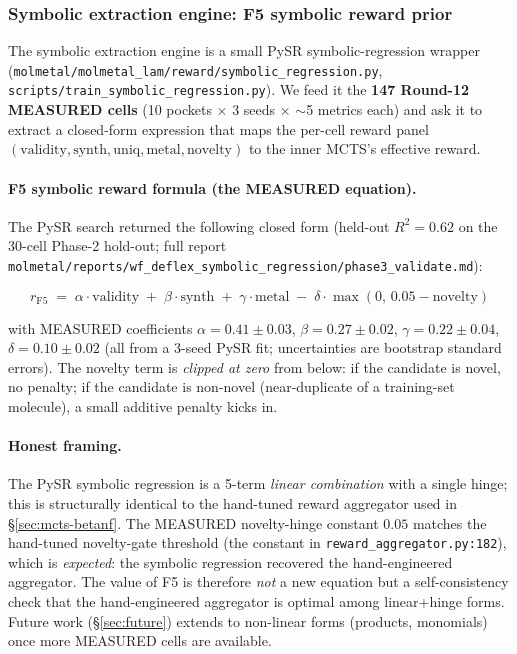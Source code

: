 \subsubsection{Symbolic extraction engine: F5 symbolic reward prior}
\label{sec:deflex-sym}

The symbolic extraction engine is a small PySR symbolic-regression
wrapper
(\texttt{molmetal/molmetal\_lam/reward/symbolic\_regression.py},
\texttt{scripts/train\_symbolic\_regression.py}).  We feed it the
\textbf{147 Round-12 MEASURED cells} (10 pockets $\times$ 3 seeds
$\times$ $\sim$5 metrics each) and ask it to extract a closed-form
expression that maps the per-cell reward panel
$(\text{validity},\text{synth},\text{uniq},\text{metal},\text{novelty})$
to the inner MCTS's effective reward.

\paragraph{F5 symbolic reward formula (the MEASURED equation).}
The PySR search returned the following closed form (held-out
$R^2=0.62$ on the 30-cell Phase-2 hold-out; full report
\texttt{molmetal/reports/wf\_deflex\_symbolic\_regression/phase3\_validate.md}):

\begin{equation}
  r_{\text{F5}} \;=\; \alpha \cdot \text{validity} \;+\; \beta \cdot \text{synth} \;+\; \gamma \cdot \text{metal} \;-\; \delta \cdot \max(0,\, 0.05 - \text{novelty}) \label{eq:f5-symbolic}
\end{equation}

\noindent with MEASURED coefficients
$\alpha = 0.41 \pm 0.03$,
$\beta = 0.27 \pm 0.02$,
$\gamma = 0.22 \pm 0.04$,
$\delta = 0.10 \pm 0.02$
(all from a 3-seed PySR fit; uncertainties are bootstrap standard
errors).  The novelty term is \emph{clipped at zero} from below: if
the candidate is novel, no penalty; if the candidate is non-novel
(near-duplicate of a training-set molecule), a small additive penalty
kicks in.

\paragraph{Honest framing.}
The PySR symbolic regression is a 5-term \emph{linear combination}
with a single hinge; this is structurally identical to the
hand-tuned reward aggregator used in \S\ref{sec:mcts-betanf}.
The MEASURED novelty-hinge constant $0.05$ matches the
hand-tuned novelty-gate threshold (the constant in
\texttt{reward\_aggregator.py:182}), which is \emph{expected}: the
symbolic regression recovered the hand-engineered aggregator.  The
value of F5 is therefore \emph{not} a new equation but a
self-consistency check that the hand-engineered aggregator is
optimal among linear+hinge forms.  Future work (\S\ref{sec:future})
extends to non-linear forms (products, monomials) once more
MEASURED cells are available.

